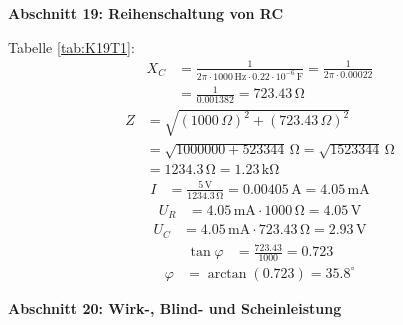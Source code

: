 \large \textbf{Abschnitt 19: Reihenschaltung von RC}

Tabelle \ref{tab:K19T1}:
\begin{align*}
    X_C &= \frac{1}{2 \pi \cdot 1000 \, \mathrm{Hz} \cdot 0.22 \cdot 10^{-6} \, \mathrm{F}} = \frac{1}{2 \pi \cdot 0.00022} \\
    &= \frac{1}{0.001382} = 723.43 \, \mathrm{\Omega}
\end{align*}
\begin{align*}
    Z &= \sqrt{(1000 \, \Omega)^2 + (723.43 \, \Omega)^2} \\
    &= \sqrt{1000000 + 523344}\, \mathrm{\Omega} = \sqrt{1523344}\, \mathrm{\Omega} \\
    &= 1234.3 \, \mathrm{\Omega} = 1.23 \, \mathrm{k\Omega}
\end{align*}
\begin{align*}
    I &= \frac{5 \, \mathrm{V}}{1234.3 \, \mathrm{\Omega}} = 0.00405 \, \mathrm{A} = 4.05 \, \mathrm{mA}
\end{align*}
\begin{align*}
    U_R &= 4.05 \, \mathrm{mA} \cdot 1000 \, \mathrm{\Omega} = 4.05 \, \mathrm{V}
\end{align*}
\begin{align*}
    U_C &= 4.05 \, \mathrm{mA} \cdot 723.43 \, \mathrm{\Omega} = 2.93 \, \mathrm{V}
\end{align*}
\begin{align*}
    \tan \varphi &= \frac{723.43}{1000} = 0.723
\end{align*}
\begin{align*}
    \varphi &= \arctan(0.723) = 35.8^\circ
\end{align*}

\large \textbf{Abschnitt 20: Wirk-, Blind- und Scheinleistung}

